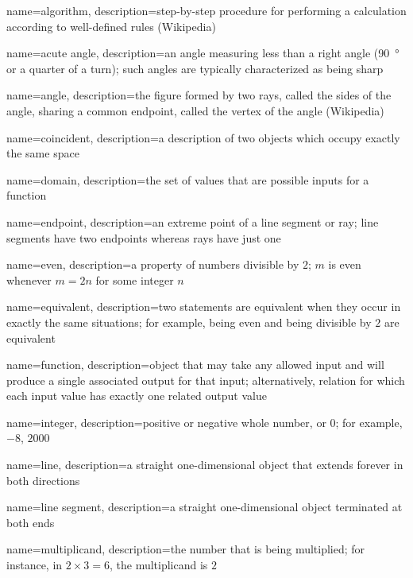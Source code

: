{
  name=algorithm,
  description={step-by-step procedure for performing a calculation
  according to well-defined rules (Wikipedia)}
}

{
  name=acute angle,
  description={an angle measuring less than a right angle (\SI{90}{\degree} or a
  quarter of a turn); such angles are typically characterized as being sharp}
}

{
  name=angle,
  description={the figure formed by two rays, called the sides of the angle,
  sharing a common endpoint, called the vertex of the angle (Wikipedia)}
}

{
  name=coincident,
  description={a description of two objects which occupy exactly the same space}
}

{
  name=domain,
  description={the set of values that are possible inputs for a function}
}

{
  name=endpoint,
  description={an extreme point of a line segment or ray; line segments have two
  endpoints whereas rays have just one}
}

{
  name=even,
  description={a property of numbers divisible by \(2\); \(m\) is even whenever
  \(m=2n\) for some integer \(n\)}
}

{
  name=equivalent,
  description={two statements are equivalent when they occur in exactly the
  same situations; for example, being even and being divisible by \(2\) are
  equivalent}
}

{
  name=function,
  description={object that may take any allowed input and will produce a
  single associated output for that input; alternatively, relation for
  which each input value has exactly one related output value}
}

{
  name=integer,
  description={positive or negative whole number, or $0$; for example,
  $-8$, $2000$}
}

{
  name=line,
  description={a straight one-dimensional object that extends forever in both
  directions}
}

{
  name=line segment,
  description={a straight one-dimensional object terminated at both ends}
}

{
  name=multiplicand,
  description={the number that is being multiplied; for instance, in
  $2\times3=6$, the multiplicand is $2$}
}

